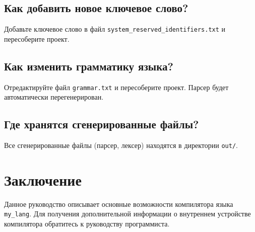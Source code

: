 \documentclass[12pt,a4paper]{article}
\begin{document}
\subsection{Как добавить новое ключевое слово?}

Добавьте ключевое слово в файл \texttt{system\_reserved\_identifiers.txt} и пересоберите проект.

\subsection{Как изменить грамматику языка?}

Отредактируйте файл \texttt{grammar.txt} и пересоберите проект. Парсер будет автоматически перегенерирован.

\subsection{Где хранятся сгенерированные файлы?}

Все сгенерированные файлы (парсер, лексер) находятся в директории \texttt{out/}.

\section{Заключение}

Данное руководство описывает основные возможности компилятора языка \texttt{my\_lang}. Для получения дополнительной информации о внутреннем устройстве компилятора обратитесь к руководству программиста.
\end{document}

